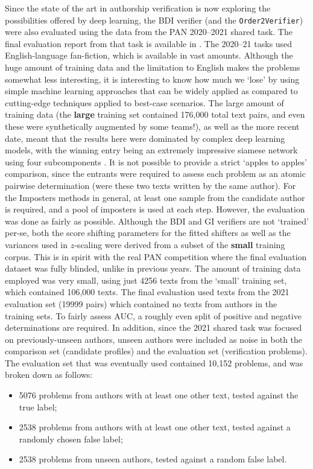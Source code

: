 \documentclass[
    hf
]{ceurart}
\begin{document}
Since the state of the art in authorship verification is now exploring the possibilities offered by
deep learning, the BDI verifier (and the \texttt{Order2Verifier}) were also evaluated using the data
from the PAN 2020--2021 shared task. The final evaluation report from that task is available in
\cite{kestemont2021overview}. The 2020--21 tasks used English-language fan-fiction, which is
available in vast amounts. Although the huge amount of training data and the limitation to English
makes the problems somewhat less interesting, it is interesting to know how much we `lose' by using
simple machine learning approaches that can be widely applied as compared to cutting-edge techniques
applied to best-case scenarios. The large amount of training data (the \textbf{large} training set
contained 176,000 total text pairs, and even these were synthetically augmented by some teams!), as
well as the more recent date, meant that the results here were dominated by complex deep learning
models, with the winning entry being an extremely impressive siamese network using four
subcomponents \cite{boenninghoff:2021}. It is not possible to provide a strict `apples to apples'
comparison, since the entrants were required to assess each problem as an atomic pairwise
determination (were these two texts written by the same author). For the Imposters methods in
general, at least one sample from the candidate author is required, and a pool of imposters is used
at each step. However, the evaluation was done as fairly as possible. Although the BDI and GI
verifiers are not `trained' per-se, both the score shifting parameters for the fitted shifters as
well as the variances used in $z$-scaling were derived from a subset of the \textbf{small} training
corpus. This is in spirit with the real PAN competition where the final evaluation dataset was fully
blinded, unlike in previous years. The amount of training data employed was very small, using just
4256 texts from the `small' training set, which contained 106,000 texts. The final evaluation used
texts from the 2021 evaluation set (19999 pairs) which contained no texts from authors in the
training sets. To fairly assess AUC, a roughly even split of positive and negative determinations
are required. In addition, since the 2021 shared task was focused on previously-unseen authors,
unseen authors were included as noise in both the comparison set (candidate profiles) and the
evaluation set (verification problems). The evaluation set that was eventually used contained 10,152
problems, and was broken down as follows:
\begin{itemize}
    \item 5076 problems from authors with at least one other text, tested against the true label;
    \item 2538 problems from authors with at least one other text, tested against a randomly chosen
          false label;
    \item 2538 problems from unseen authors, tested against a random false label.
\end{itemize}
\end{document}
